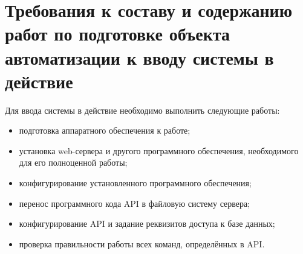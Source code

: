 \chapter{\enskip \nohyphens{Требования к составу и содержанию работ по подготовке объекта автоматизации к вводу системы в действие}}

\par
	Для ввода системы в действие необходимо выполнить следующие работы:

	\begin{itemize}
		\item подготовка аппаратного обеспечения к работе;
		\item установка web-сервера и другого программного обеспечения, необходимого для его полноценной работы;
		\item конфигурирование установленного программного обеспечения;
		\item перенос программного кода API в файловую систему сервера;
		\item конфигурирование API и задание реквизитов доступа к базе данных;
		\item проверка правильности работы всех команд, определённых в API.
	\end{itemize}
